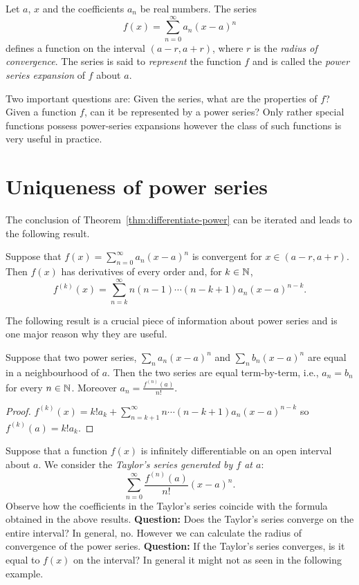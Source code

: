 Let \(a\), \(x\) and the coefficients \(a_n\) be real numbers.
The series
\[
  f(x) = \sum_{n=0}^{\infty} a_n {(x-a)}^n
\]
defines a function on the interval \((a-r,a+r)\),
where  \(r\)  is the \emph{radius of convergence}.
%
The series is said to \emph{represent} the function \(f\)
and is called the \emph{power series expansion} of \(f\) about \(a\).

Two important questions are: Given the series, what are the properties of \(f\)?
Given a function \(f\), can it be represented by a power series?
Only rather special functions possess power-series expansions however the class of such functions is very useful in practice.



\section{Uniqueness of power series}

The conclusion of Theorem~\ref{thm:differentiate-power} can be iterated and leads to the following result.

\begin{theorem}
  Suppose that \(f(x) = \sum_{n=0}^{\infty} a_n {(x-a)}^n\) is convergent for \(x\in (a-r,a+r)\).
  Then \(f(x)\) has derivatives of every order and, for \(k\in \mathbb{N}\),
  \[
    f^{(k)}(x) =\sum_{n=k}^{\infty} n(n-1)\cdots (n-k+1) a_n{(x-a)}^{n-k}.
  \]
\end{theorem}

The following result is a crucial piece of information about power series and is one major reason why they are useful.

\begin{theorem}%
  \label{thm:unique-power}
  Suppose that two power series, \(\sum_n a_n {(x-a)}^n\) and  \(\sum_n b_n {(x-a)}^n\) are equal in a neighbourhood of \(a\).
  Then the two series are equal term-by-term, i.e.,
  \(a_n = b_n\) for every \(n\in \mathbb{N}\).
  Moreover  \(a_n = \frac{f^{(n)}(a)}{n!}\).
\end{theorem}

\begin{proof}
  \(f^{(k)}(x) = k! a_k + \displaystyle\sum_{n=k+1}^{\infty} n\cdots (n-k+1) a_n {(x-a)}^{n-k}\)
  so \(f^{(k)}(a) = k! a_k \).
\end{proof}


Suppose that a function \(f(x)\) is infinitely differentiable on an open interval about \(a\).
We consider the \emph{Taylor's series generated by \(f\) at \(a\)}:
\[
  \sum_{n=0}^{\infty} \frac{f^{(n)}(a)}{n!} {(x-a)}^{n}.
\]
Observe how the coefficients in the Taylor's series coincide with the formula obtained in the above results.
\textbf{Question:}
Does the Taylor's series converge on the entire interval?
In general, no. However we can calculate the radius of convergence of the power series.
\textbf{Question:}
If the Taylor's series converges, is it equal to \(f(x)\) on the interval?
{In general it might not as seen in the following example.}

